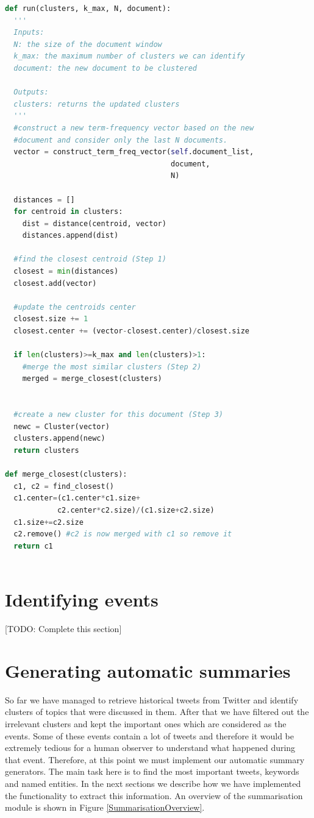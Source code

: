 \begin{lstlisting}[language=Python, label=OnlineClustererSnippet, caption=Pseudocode for the online clustering algorithm]
def run(clusters, k_max, N, document):
  '''
  Inputs:
  N: the size of the document window
  k_max: the maximum number of clusters we can identify 
  document: the new document to be clustered 

  Outputs:
  clusters: returns the updated clusters
  '''    
  #construct a new term-frequency vector based on the new
  #document and consider only the last N documents. 
  vector = construct_term_freq_vector(self.document_list, 
                                      document, 
                                      N)

  distances = []
  for centroid in clusters:
    dist = distance(centroid, vector)
    distances.append(dist)
  
  #find the closest centroid (Step 1)
  closest = min(distances)
  closest.add(vector)

  #update the centroids center  
  closest.size += 1
  closest.center += (vector-closest.center)/closest.size
  
  if len(clusters)>=k_max and len(clusters)>1:
    #merge the most similar clusters (Step 2)
    merged = merge_closest(clusters)
  
  
  #create a new cluster for this document (Step 3)
  newc = Cluster(vector)
  clusters.append(newc)
  return clusters
  
def merge_closest(clusters):
  c1, c2 = find_closest()
  c1.center=(c1.center*c1.size+
            c2.center*c2.size)/(c1.size+c2.size)
  c1.size+=c2.size
  c2.remove() #c2 is now merged with c1 so remove it
  return c1
    
\end{lstlisting}

\section{Identifying events}\label{IdentifyEvents}
[TODO: Complete this section]

\section{Generating automatic summaries}
So far we have managed to retrieve historical tweets from Twitter and identify clusters of topics that were discussed in them. After that we have filtered out the irrelevant clusters and kept the important ones which are considered as the events. Some of these events contain a lot of tweets and therefore it would be extremely tedious for a human observer to understand what happened during that event. Therefore, at this point we must implement our automatic summary generators. The main task here is to find the most important tweets, keywords and named entities. In the next sections we describe how we have implemented the functionality to extract this information. An overview of the summarisation module is shown in Figure \ref{SummarisationOverview}.  

